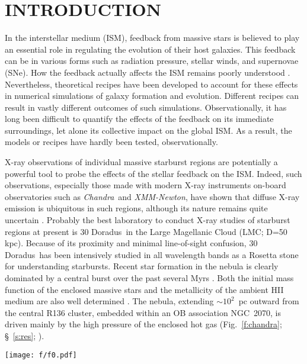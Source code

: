 \documentclass[usenatbib]{mnras}
\def\xs{30 Doradus}
\def\chandra{{\sl Chandra}}
\def\xmm{{\sl XMM-Newton}}
\begin{document}
\section{INTRODUCTION}
\label{s:intro}
In the interstellar medium (ISM), feedback from massive stars is believed to play an essential role in regulating the evolution of their host galaxies. This feedback can be in various forms such as radiation pressure, stellar winds, and supernovae (SNe). How the feedback actually affects the ISM remains poorly understood \citep[e.g.][]{krause14}. Nevertheless, theoretical recipes \citep[e.g.][]{agertz13} have been developed to account for these effects in numerical simulations of galaxy formation and evolution. Different recipes can result in vastly different outcomes of such simulations. Observationally, it has long been difficult to quantify the effects of the feedback on its immediate surroundings, let alone its collective impact on the global ISM. As a result, the models or recipes have hardly been tested, observationally.  

X-ray observations of individual massive starburst regions are potentially a powerful tool to probe the effects of the stellar feedback on the ISM. Indeed, such observations, especially those made with modern X-ray instruments on-board observatories such as \chandra\ and \xmm, have shown that diffuse X-ray emission is ubiquitous in such regions, although its nature remains quite uncertain \citep[e.g.,][]{Strickland, Richings}. Probably the best laboratory to conduct X-ray studies of starburst regions at present  is \xs\ in the Large Magellanic Cloud (LMC; D=50 kpc). Because of its proximity and minimal line-of-sight confusion, \xs\ has been intensively studied in all wavelength bands as a Rosetta stone for understanding starbursts.
Recent star formation in the nebula is clearly dominated by a central burst  over the past several Myrs \citep{selman99, grebel00, rubio98, walborn99, cignoni15}. Both the initial mass function of the enclosed massive stars and the metallicity of the ambient HII medium are also well determined \citep[e.g.,][]{mathis85, Lopez2011, Pellegrini11}. 
The nebula, extending $\sim 10^2$~pc outward from the central R136 cluster, embedded within an OB association NGC~2070, is driven mainly by the high pressure of the enclosed hot gas (Fig.~\ref{f:chandra}; \S~\ref{s:res}; \citealt{Wang2, wang99, Townsley1, Pellegrini10}).

\begin{figure*}
\texttt{[image: f/f0.pdf]}
\caption{Multi-wavelength montages of \xs: (A) 0.5-2~keV (red), H$\alpha$ (green), and UV (blue); (B) \chandra\ images in the 0.5-1~keV (red), 1-2~keV (green), and 2-8~keV (blue) bands. The H$\alpha$ image was taken with the 4m telescope at Cerro Tololo Inter-American Observatory \citep{Chu}, while the UV image was from the GALEX survey.}
\label{f:chandra}
\end{figure*}
\end{document}
